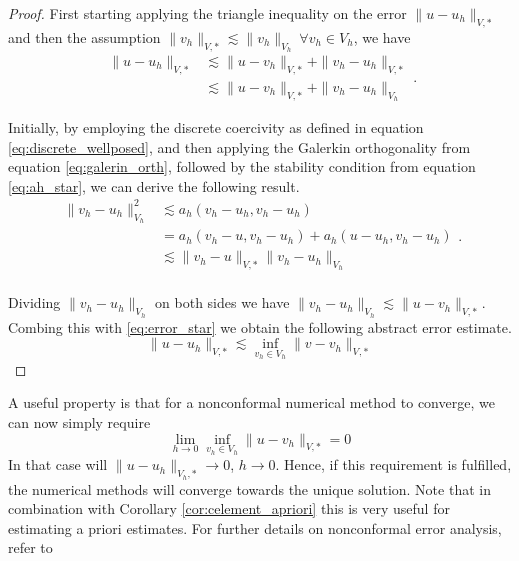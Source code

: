 \documentclass[11pt]{article}
\theoremstyle{remark}
\numberwithin{equation}{section}
\begin{document}
\begin{proof}
    First starting  applying the triangle inequality on the error $\| u - u_{h} \|_{V,*  }^{  } $ and then the assumption $\| v_{h} \|_{ V,* }^{  } \lesssim  \| v_{h} \|_{V_{h}  }^{  } \ \forall  v_{h} \in V_{h}  $, we have
    \begin{equation}
        \label{eq:error_star}
        \begin{split}
        \| u - u_{h} \|_{V,*  }^{  } & \lesssim \| u - v_{h} \|_{V,*  }^{  } + \| v_{h} - u_{h} \|_{V,*  }^{  } \\
                                     & \lesssim \| u - v_{h} \|_{V,*  }^{  } + \| v_{h} - u_{h} \|_{V_{h}  }^{  }
        \end{split}.
    \end{equation}

Initially, by employing the discrete coercivity as defined in equation \eqref{eq:discrete_wellposed}, and then applying the Galerkin orthogonality from equation \eqref{eq:galerin_orth}, followed by the stability condition from equation \eqref{eq:ah_star}, we can derive the following result.
    \begin{equation}
        \label{eq:cealemma_proof}
        \begin{split}
            \| v_{h} -u_{h} \|_{ V_{h}  }^{ 2 } & \lesssim   a_{h}( v_{h} - u_{h}, v_{h} - u_{h} )    \\
                                                &= a_{h}( v_{h} - u, v_{h}- u_{h}) + a_{h}( u - u_{h}, v_{h} - u_{h})   \\
                                                & \lesssim \| v_{h}- u \|_{ V,* }^{  } \| v_{h}- u_{h} \|_{V_{h} }^{  }   \\
        \end{split}
    .\end{equation}

    Dividing $\| v_{h}- u_{h} \|_{V_{h} }^{  }$ on both sides we have $ \| v_{h}- u_{h} \|_{V_{h} }^{  } \lesssim \|  u -  v_{h}\|_{ V,* }^{  } $. Combing this with \eqref{eq:error_star} we obtain the following abstract error estimate.
    \begin{equation}
        \| u - u_{h} \|_{ V,*  }^{  }  \lesssim  \inf_{v_{h} \in  V_{h}}  \| v - v_{h} \|_{ V_{},*  }^{  }
    \end{equation}
\end{proof}

A useful property is that for a nonconformal numerical method to converge, we can now simply require
\begin{equation}
\lim_{h \to 0}  \inf_{v_{h} \in  V_{h}}  \| u - v_{h} \|_{ V,*  }^{  } = 0
\end{equation}
In that case will $\| u - u_{h} \|_{ V_{h},*  }^{  }  \to  0$, $h \to  0$. Hence, if this requirement is fulfilled, the numerical methods will converge towards the unique solution.
Note that in combination with Corollary \ref{cor:celement_apriori} this is very useful for estimating a priori estimates. For further details on nonconformal error analysis, refer to \cite[Chapter 1.3]{pietro2012}
\end{document}
